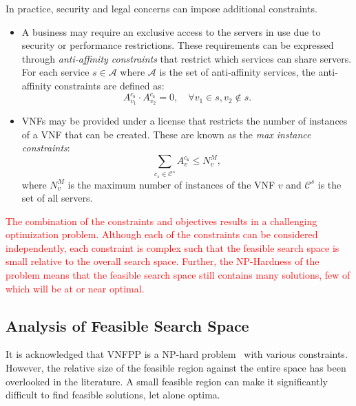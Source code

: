 In practice, security and legal concerns can impose additional constraints.
\begin{itemize}
	\setcounter{enumi}{3}
	\item A business may require an exclusive access to the servers in use due to security or performance restrictions. These requirements can be expressed through \textit{anti-affinity constraints} that restrict which services can share servers. For each service $s\in\mathcal{A}$ where $\mathcal{A}$ is the set of anti-affinity services, the anti-affinity constraints are defined as:
	      \begin{equation}
		      A^{c_{\mathsf{s}}}_{v_1}\cdot A^{c_{\mathsf{s}}}_{v_2}=0,\quad\forall v_1\in s, v_2\notin s.
	      \end{equation}

	\item VNFs may be provided under a license that restricts the number of instances of a VNF that can be created. These are known as the \textit{max instance constraints}:
	      \begin{equation}
		      \sum_{c_s\in\mathcal{C}^s} A_v^{c_{\mathsf{s}}}\leq N_v^M,
		      \label{eq:max_instances}
	      \end{equation}
	      where $N^M_v$ is the maximum number of instances of the VNF $v$ and $\mathcal{C}^{s}$ is the set of all servers.
\end{itemize}

\textcolor{red}{The combination of the constraints and objectives results in a challenging optimization problem. Although each of the constraints can be considered independently, each constraint is complex such that the feasible search space is small relative to the overall search space. Further, the NP-Hardness of the problem means that the feasible search space still contains many solutions, few of which will be at or near optimal.}

\subsection{Analysis of Feasible Search Space}
\label{sec:complexity}

It is acknowledged that VNFPP is a NP-hard problem~\cite{CohenLNR15,LuizelliCBG17,SangJGDY17} with various constraints. However, the relative size of the feasible region against the entire space has been overlooked in the literature. A small feasible region can make it significantly difficult to find feasible solutions, let alone optima.

